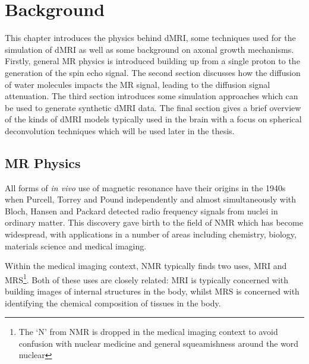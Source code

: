 \renewcommand{\BrainFuckChapter}{y}
\renewcommand{\LifeChapter}{y}
\chapter{Background}
\label{chap:background}
\chaptertoc{}

\begin{chapterabstract}
  This chapter introduces the physics behind \ac{dMRI}, some techniques used for the simulation of \ac{dMRI} as well as some background on axonal growth mechanisms.
  Firstly, general MR physics is introduced building up from a single proton to the generation of the spin echo signal.
  The second section discusses how the diffusion of water molecules impacts the MR signal, leading to the diffusion signal attenuation.
  The third section introduces some simulation approaches which can be used to generate synthetic \ac{dMRI} data.
  The final section gives a brief overview of the kinds of \ac{dMRI} models typically used in the brain with a focus on spherical deconvolution techniques which will be used later in the thesis.
\end{chapterabstract}

\section{MR Physics}
\label{sec:bg_mri_physics}
All forms of \emph{in vivo} use of magnetic resonance have their origins in the 1940s when Purcell, Torrey and Pound independently and almost simultaneously with Bloch, Hansen and Packard detected radio frequency signals from nuclei in ordinary matter\cite{Levitt2008, Barker2009,Bloch1946,Purcell1946}.
This discovery gave birth to the field of \ac{NMR} which has become widespread, with applications in a number of areas including chemistry, biology, materials science and medical imaging\cite{Barker2009, Salibi1998}.

Within the medical imaging context, \ac{NMR} typically finds two uses, \acf{MRI} and \ac{MRS}\footnote{The `N' from NMR is dropped in the medical imaging context to avoid confusion with nuclear medicine and general squeamishness around the word nuclear}.
Both of these uses are closely related: \ac{MRI} is typically concerned with building images of internal structures in the body, whilst \ac{MRS} is concerned with identifying the chemical composition of tissues in the body.

